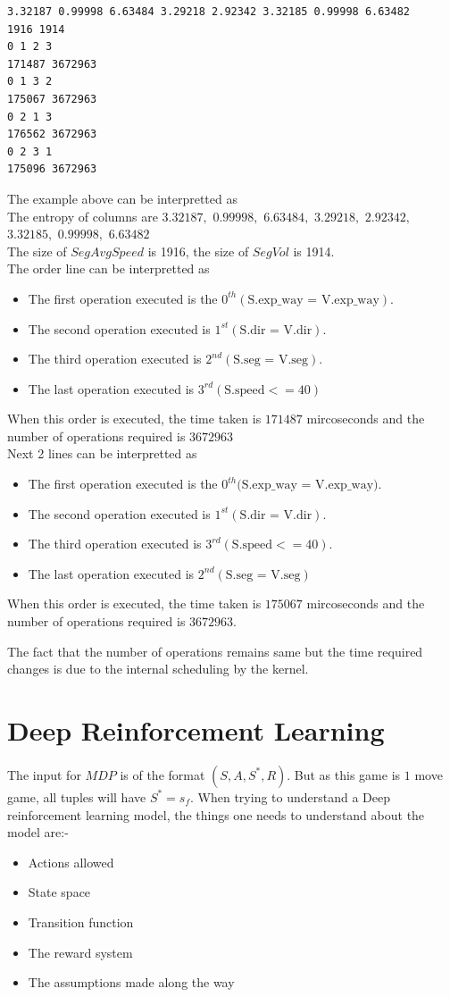 \begin{lstlisting}[caption=Data for DQN]
3.32187 0.99998 6.63484 3.29218 2.92342 3.32185 0.99998 6.63482 
1916 1914
0 1 2 3 
171487 3672963
0 1 3 2 
175067 3672963
0 2 1 3 
176562 3672963
0 2 3 1 
175096 3672963
\end{lstlisting}
The example above can be interpretted as\\
The entropy of columns are $3.32187,$ $0.99998,$ $6.63484,$ $3.29218,$ $2.92342,$ $3.32185,$ $0.99998,$ $6.63482$\\
The size of $SegAvgSpeed$ is 1916, the size of $SegVol$ is 1914.\\
The order line can be interpretted as
\begin{itemize} 
    \item The first operation executed is the $0^{th}(\text{S.exp\_way = V.exp\_way})$.
    \item The second operation executed is $1^{st}(\text{S.dir = V.dir})$.
    \item The third operation executed is $2^{nd}(\text{S.seg = V.seg})$.
    \item The last operation executed is $3^{rd}(\text{S.speed} <= 40)$
\end{itemize} 
When this order is executed, the time taken is $171487$ mircoseconds and the number of operations required is $3672963$\\
Next 2 lines can be interpretted as 
\begin{itemize}
    \item The first operation executed is the $0^{th}($$\text{S.exp\_way = V.exp\_way})$.
    \item The second operation executed is $1^{st}(\text{S.dir = V.dir})$.
    \item The third operation executed is $3^{rd}(\text{S.speed} <= 40)$.
    \item The last operation executed is $2^{nd}(\text{S.seg = V.seg})$
\end{itemize} 
When this order is executed, the time taken is $175067$ mircoseconds and the number of operations required is $3672963$. 
\par The fact that the number of operations remains same but the time required changes is due to the internal scheduling by the kernel.

\section{Deep Reinforcement Learning}
The input for $MDP$ is of the format $(S,A,S^{*},R)$. But as this game is $1$ move game, all tuples will have $S^{*}=s_{f}$. When trying to understand a Deep reinforcement learning model, the things one needs to understand about the model are:-
\begin{itemize}
    \item Actions allowed
    \item State space
    \item Transition function
    \item The reward system
    \item The assumptions made along the way
\end{itemize}

